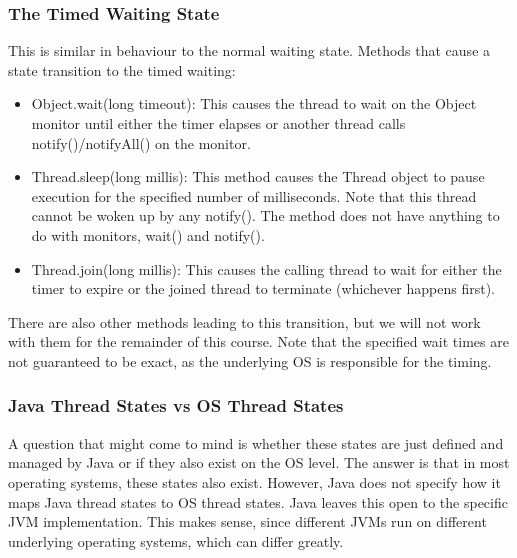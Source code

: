 \documentclass[main.tex]{subfiles}
\begin{document}
\subsubsection{The Timed Waiting State}
This is similar in behaviour to the normal waiting state. Methods that cause a state transition to the timed waiting:
\begin{itemize}
  \item Object.wait(long timeout): This causes the thread to wait on the Object monitor until either the timer elapses or another thread calls notify()/notifyAll() on the monitor.
  \item Thread.sleep(long millis): This method causes the Thread object to pause execution for the specified number of milliseconds. Note that this thread cannot be woken up by any notify(). The method does not have anything to do with monitors, wait() and notify().
  \item Thread.join(long millis): This causes the calling thread to wait for either the timer to expire or the joined thread to terminate (whichever happens first).
\end{itemize}
There are also other methods leading to this transition, but we will not work with them for the remainder of this course. Note that the specified wait times are not guaranteed to be exact, as the underlying OS is responsible for the timing.
\subsubsection{Java Thread States vs OS Thread States}
A question that might come to mind is whether these states are just defined and managed by Java or if they also exist on the OS level. The answer is that in most operating systems, these states also exist. However, Java does not specify how it maps Java thread states to OS thread states. Java leaves this open to the specific JVM implementation. This makes sense, since different JVMs run on different underlying operating systems, which can differ greatly.
\end{document}
